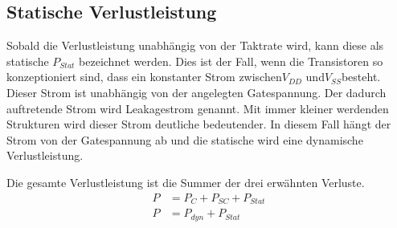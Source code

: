 \subsection{Statische Verlustleistung}\label{subsec:statVerl}
Sobald die Verlustleistung unabhängig von der Taktrate wird, kann diese als statische \(P_{Stat}\) bezeichnet werden. Dies ist der Fall, wenn die Transistoren so konzeptioniert sind, dass ein konstanter Strom zwischen\(V_{DD}\) und\(V_{SS}\)besteht. Dieser Strom ist unabhängig von der angelegten Gatespannung. Der dadurch auftretende Strom wird Leakagestrom genannt. Mit immer kleiner werdenden Strukturen wird dieser Strom deutliche bedeutender. In diesem Fall hängt der Strom von der Gatespannung ab und die statische wird eine dynamische Verlustleistung.


Die gesamte Verlustleistung ist die Summer der drei erwähnten Verluste.
\begin{equation}
\begin{aligned}
P &= P_{ C }+P_{ SC }+P_{ Stat}\\
P &= P_{dyn}+P_{Stat}
\label{eq:verlustleistung}
\end{aligned}
\end{equation}


